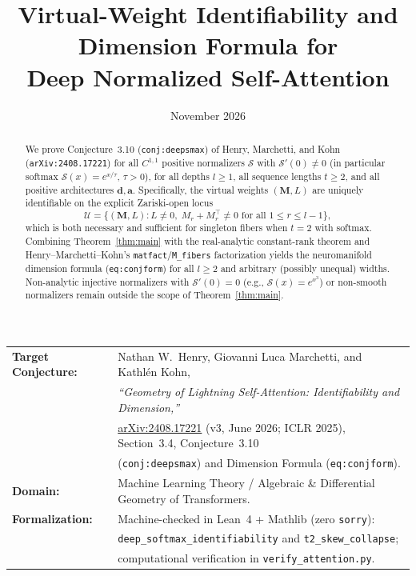 \documentclass[11pt]{article}
\title{Virtual-Weight Identifiability and Dimension Formula for\\
Deep Normalized Self-Attention}
\author{}
\date{November 2026}
\theoremstyle{plain}
\theoremstyle{definition}
\theoremstyle{remark}
\newcommand{\calS}{\mathcal{S}}
\newcommand{\calU}{\mathcal{U}}
\newcommand{\bfM}{\mathbf{M}}
\newcommand{\bfd}{\mathbf{d}}
\newcommand{\bfa}{\mathbf{a}}
\begin{document}
\maketitle

\begin{center}
\small
\begin{tabular}{@{}ll@{}}
\textbf{Target Conjecture:} & Nathan W.\ Henry, Giovanni Luca Marchetti, and Kathl\'en Kohn, \\
& \emph{``Geometry of Lightning Self-Attention: Identifiability and Dimension,''} \\
& \href{https://arxiv.org/abs/2408.17221}{arXiv:2408.17221} (v3, June 2026; ICLR 2025), Section~3.4, Conjecture~3.10 \\
& (\texttt{conj:deepsmax}) and Dimension Formula (\texttt{eq:conjform}). \\
\textbf{Domain:} & Machine Learning Theory / Algebraic \& Differential Geometry of Transformers. \\
\textbf{Formalization:} & Machine-checked in Lean~4 + Mathlib (zero \texttt{sorry}): \\
& \texttt{deep\_softmax\_identifiability} and \texttt{t2\_skew\_collapse}; \\
& computational verification in \texttt{verify\_attention.py}.
\end{tabular}
\end{center}

\begin{abstract}
We prove Conjecture~3.10 (\texttt{conj:deepsmax}) of Henry, Marchetti, and Kohn (\texttt{arXiv:2408.17221}) for all $C^{1,1}$ positive normalizers $\calS$ with $\calS'(0) \neq 0$ (in particular softmax $\calS(x) = e^{x/\tau}$, $\tau > 0$), for all depths $l \ge 1$, all sequence lengths $t \ge 2$, and all positive architectures $\bfd, \bfa$. Specifically, the virtual weights $(\bfM, L)$ are uniquely identifiable on the explicit Zariski-open locus
\[
\calU = \bigl\{(\bfM, L) : L \neq 0,\; M_r + M_r^\top \neq 0 \text{ for all } 1 \le r \le l - 1\bigr\},
\]
which is both necessary and sufficient for singleton fibers when $t = 2$ with softmax. Combining Theorem~\ref{thm:main} with the real-analytic constant-rank theorem and Henry--Marchetti--Kohn's \texttt{matfact}/\texttt{M\_fibers} factorization yields the neuromanifold dimension formula (\texttt{eq:conjform}) for all $l \ge 2$ and arbitrary (possibly unequal) widths. Non-analytic injective normalizers with $\calS'(0) = 0$ (e.g., $\calS(x) = e^{x^3}$) or non-smooth normalizers remain outside the scope of Theorem~\ref{thm:main}.
\end{abstract}
\end{document}
